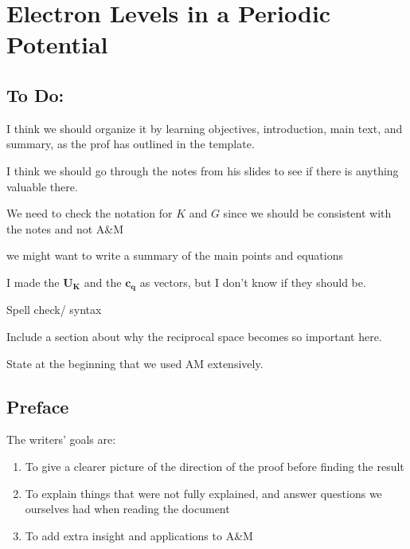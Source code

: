 \chapter{Electron Levels in a Periodic Potential}

\listoftodos

\section{To Do:}
	I think we should organize it by learning objectives, introduction, main text, and summary, as the prof has outlined in the template.

	I think we should go through the notes from his slides to see if there is anything valuable there.

	We need to check the notation for $K$ and $G$ since we should be consistent with the notes and not A\&M

	we might want to write a summary of the main points and equations

	I made the $\mathbf{U_K}$ and the $\mathbf{c_q}$ as vectors, but I don't know if they should be.

	Spell check/ syntax

	Include a section about why the reciprocal space becomes so important here.

	State at the beginning that we used AM extensively.

\section{Preface}

	The writers' goals are:
	\begin{enumerate}
		\item To give a clearer picture of the direction of the proof before finding the result
		\item To explain things that were not fully explained, and answer questions we ourselves had when reading the document
		\item To add extra insight and applications to A\&M
	\end{enumerate}


